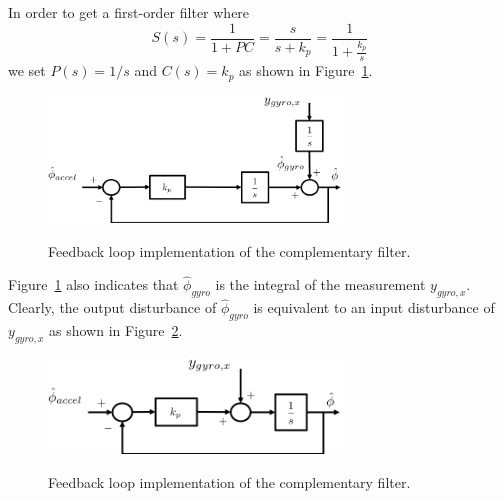 In order to get a first-order filter where 
$$ 
S(s) = \frac{1}{1+PC} = \frac{s}{s+k_p} = \frac{1}{1+\frac{k_p}{s}}
$$
we set $P(s) = 1/s$ and $C(s)=k_p$ as shown in Figure~\ref{fig:complementary_filter_roll_2}.  
\begin{figure}[hhhhtb]
  \centering
  \includegraphics[width=0.7\textwidth]{chap11_attitude_estimation/figures/complementary_filter_roll_2}\\
  \caption{Feedback loop implementation of the complementary filter.}%
  \label{fig:complementary_filter_roll_2}
\end{figure}
Figure~\ref{fig:complementary_filter_roll_2} also indicates that $\hat{\phi}_{gyro}$ is the integral of the measurement $y_{gyro,x}$.  Clearly, the output disturbance of $\hat{\phi}_{gyro}$ is equivalent to an input disturbance of $y_{gyro,x}$ as shown in Figure~\ref{fig:complementary_filter_roll_3}.
\begin{figure}[hhhhtb]
  \centering
  \includegraphics[width=0.7\textwidth]{chap11_attitude_estimation/figures/complementary_filter_roll_3}\\
  \caption{Feedback loop implementation of the complementary filter.}%
  \label{fig:complementary_filter_roll_3}
\end{figure}

